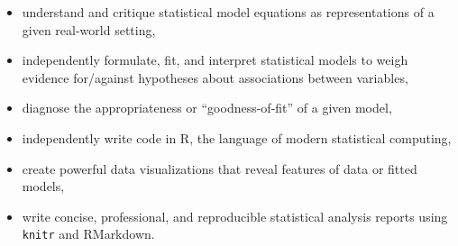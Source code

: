 \documentclass[10pt]{article}
\begin{document}
\begin{itemize}
\item understand and critique statistical model equations as representations of a given real-world setting,
\item independently formulate, fit, and interpret statistical models to weigh evidence for/against hypotheses about associations between variables, 
\item diagnose the appropriateness or ``goodness-of-fit'' of a given model,
\item independently write code in R, the language of modern statistical computing,
\item create powerful data visualizations that reveal features of data or fitted models,
\item write concise, professional, and reproducible statistical analysis reports using {\tt knitr} and RMarkdown.
\end{itemize}
    
\end{document}
